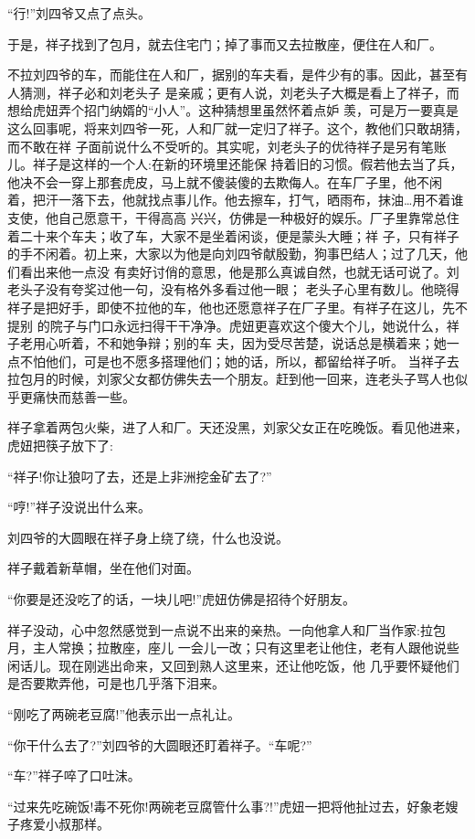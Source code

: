 \documentclass[11pt,a4paper,onecolumn]{article}
\begin{document}
``行!''刘四爷又点了点头。

于是，祥子找到了包月，就去住宅门；掉了事而又去拉散座，便住在人和厂。

不拉刘四爷的车，而能住在人和厂，据别的车夫看，是件少有的事。因此，甚至有人猜测，祥子必和刘老头子
是亲戚；更有人说，刘老头子大概是看上了祥子，而想给虎妞弄个招门纳婿的``小人''。这种猜想里虽然怀着点妒
羡，可是万一要真是这么回事呢，将来刘四爷一死，人和厂就一定归了祥子。这个，教他们只敢胡猜，而不敢在祥
子面前说什么不受听的。其实呢，刘老头子的优待祥子是另有笔账儿。祥子是这样的一个人:在新的环境里还能保
持着旧的习惯。假若他去当了兵，他决不会一穿上那套虎皮，马上就不傻装傻的去欺侮人。在车厂子里，他不闲
着，把汗一落下去，他就找点事儿作。他去擦车，打气，晒雨布，抹油\ldots 用不着谁支使，他自己愿意干，干得高高
兴兴，仿佛是一种极好的娱乐。厂子里靠常总住着二十来个车夫；收了车，大家不是坐着闲谈，便是蒙头大睡；祥
子，只有祥子的手不闲着。初上来，大家以为他是向刘四爷献殷勤，狗事巴结人；过了几天，他们看出来他一点没
有卖好讨俏的意思，他是那么真诚自然，也就无话可说了。刘老头子没有夸奖过他一句，没有格外多看过他一眼；
老头子心里有数儿。他晓得祥子是把好手，即使不拉他的车，他也还愿意祥子在厂子里。有祥子在这儿，先不提别
的院子与门口永远扫得干干净净。虎妞更喜欢这个傻大个儿，她说什么，祥子老用心听着，不和她争辩；别的车
夫，因为受尽苦楚，说话总是横着来；她一点不怕他们，可是也不愿多搭理他们；她的话，所以，都留给祥子听。
当祥子去拉包月的时候，刘家父女都仿佛失去一个朋友。赶到他一回来，连老头子骂人也似乎更痛快而慈善一些。

祥子拿着两包火柴，进了人和厂。天还没黑，刘家父女正在吃晚饭。看见他进来，虎妞把筷子放下了:

``祥子!你让狼叼了去，还是上非洲挖金矿去了?''

``哼!''祥子没说出什么来。

刘四爷的大圆眼在祥子身上绕了绕，什么也没说。

祥子戴着新草帽，坐在他们对面。

``你要是还没吃了的话，一块儿吧!''虎妞仿佛是招待个好朋友。

祥子没动，心中忽然感觉到一点说不出来的亲热。一向他拿人和厂当作家:拉包月，主人常换；拉散座，座儿
一会儿一改；只有这里老让他住，老有人跟他说些闲话儿。现在刚逃出命来，又回到熟人这里来，还让他吃饭，他
几乎要怀疑他们是否要欺弄他，可是也几乎落下泪来。

``刚吃了两碗老豆腐!''他表示出一点礼让。

``你干什么去了?''刘四爷的大圆眼还盯着祥子。``车呢?''

``车?''祥子啐了口吐沫。

``过来先吃碗饭!毒不死你!两碗老豆腐管什么事?!''虎妞一把将他扯过去，好象老嫂子疼爱小叔那样。
\end{document}
